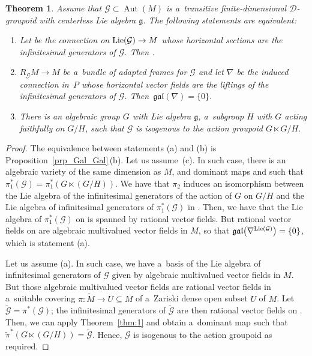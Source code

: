 \documentclass[pdftex]{sigma}
\numberwithin{equation}{section}
\newtheorem{Theorem}{Theorem}[section]
\theoremstyle{definition}
\begin{document}
\begin{Theorem}\label{thm:2}
Assume that $\mathcal G\subset\operatorname{Aut}(M)$ is a~transitive finite-dimensional $\mathcal D$-groupoid with centerless Lie algebra $\mathfrak g$. The following statements are equivalent:
\begin{enumerate}\itemsep=0pt
\item[$(a)$] Let  be the connection on ${\rm Lie}(\mathcal G)\to M$ whose horizontal sections are the infinitesimal generators of $\mathcal G$. Then .
\item[$(b)$] $R_{\mathcal G}M\to M$ be a~bundle of adapted frames for $\mathcal G$ and let $\nabla$ be the induced connection in~$P$ whose horizontal vector fields are the liftings of the infinitesimal generators of $\mathcal G$. Then~${\mathfrak {gal}(\nabla) = \{0\}}$.
\item[$(c)$] There is an algebraic group $G$ with Lie algebra $\mathfrak g$, a~subgroup $H$ with $G$ acting faithfully on $G/H$, such that $\mathcal G$ is isogenous to the action groupoid $G\ltimes G/H$.
\end{enumerate}
\end{Theorem}

\begin{proof}
The equivalence between statements (a) and (b) is Proposition~\ref{prp_Gal_Gal}\,(b). Let us assume~(c). In such case, there is an algebraic variety  of the same dimension as $M$, and dominant maps  and  such that
$\pi_1^*(\mathcal G) = \pi_1^*(G\ltimes (G/H))$. We have that $\pi_2$ induces an isomorphism between the Lie algebra of the infinitesimal generators of the action of $G$ on $G/H$ and the Lie algebra of infinitesimal generators of $\pi_1^*(\mathcal G)$ in . Then, we have that the Lie algebra of $\pi_1^*(\mathcal G)$ on  is spanned by rational vector fields. But rational vector fields on  are algebraic multivalued vector fields in $M$, so that $\mathfrak{gal}\bigl(\nabla^{{\rm Lie}(\mathcal G)}\bigr) = \{0\}$, which is statement (a).

Let us assume (a). In such case, we have a~basis of the Lie algebra of infinitesimal generators of $\mathcal G$ given by algebraic multivalued vector fields in $M$. But those algebraic multivalued vector fields are rational vector fields in a~suitable covering $\pi\colon \widetilde M \to U \subseteq M$ of a~Zariski dense open subset $U$ of $M$.
Let $\widetilde{\mathcal G} = \pi^*(\mathcal G)$; the infinitesimal generators of $\widetilde{\mathcal G}$ are then rational vector fields on . Then, we can apply Theorem~\ref{thm:1} and obtain a~dominant map  such that~${\widetilde\pi^*(G\ltimes (G/H)) = \widetilde{\mathcal G}}$. Hence, $\mathcal G$ is isogenous to the action groupoid as required.
\end{proof}
\end{document}
